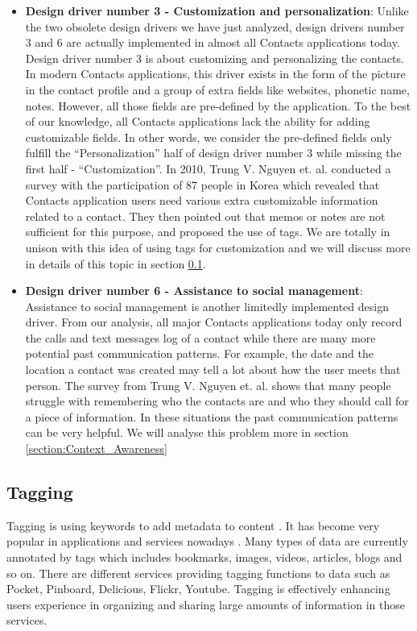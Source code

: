 \begin{itemize}
  \item \textbf{Design driver number 3 - Customization and personalization}: Unlike the two obsolete design drivers we have just analyzed, design drivers number 3 and 6 are actually implemented in almost all Contacts applications today. Design driver number 3 is about customizing and personalizing the contacts. In modern Contacts applications, this driver exists in the form of the picture in the contact profile and a group of extra fields like websites, phonetic name, notes. However, all those fields are pre-defined by the application. To the best of our knowledge, all Contacts applications lack the ability for adding customizable fields. In other words, we consider the pre-defined fields only fulfill the ``Personalization'' half of design driver number 3 while missing the first half - ``Customization''. In 2010, Trung V. Nguyen et. al. \cite{tagging} conducted a survey with the participation of 87 people in Korea which revealed that Contacts application users need various extra customizable information related to a contact. They then pointed out that memos or notes are not sufficient for this purpose, and proposed the use of tags. We are totally in unison with this idea of using tags for customization and we will discuss more in details of this topic in section \ref{section:Tagging}.
  \item \textbf{Design driver number 6 - Assistance to social management}: Assistance to social management is another limitedly implemented design driver. From our analysis, all major Contacts applications today only record the calls and text messages log of a contact while there are many more potential past communication patterns. For example, the date and the location a contact was created may tell a lot about how the user meets that person. The survey from Trung V. Nguyen et. al. \cite{tagging} shows that many people struggle with remembering who the contacts are and who they should call for a piece of information. In these situations the past communication patterns can be very helpful. We will analyse this problem more in section \ref{section:Context_Awareness}
\end{itemize}

\subsection{Tagging}
\label{section:Tagging}

Tagging is using keywords to add metadata to content \cite{golder2006usage}. It has become very popular in applications and services nowadays \cite{cattuto2007semiotic, golder2006usage, marlow2006ht06}. Many types of data are currently annotated by tags which includes bookmarks, images, videos, articles, blogs and so on. There are different services providing tagging functions to data such as Pocket, Pinboard, Delicious, Flickr, Youtube. Tagging is effectively enhancing users experience in organizing and sharing large amounts of information in those services.

